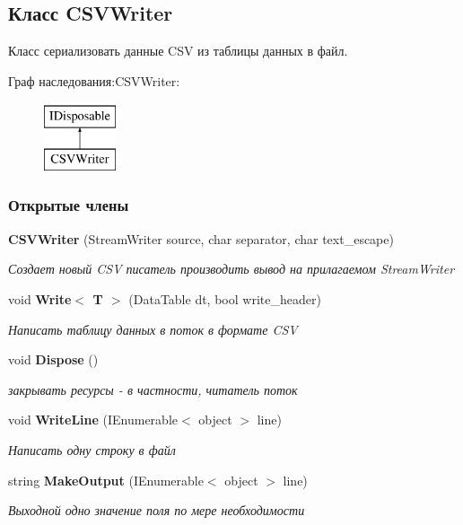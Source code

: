 \subsection{Класс C\+S\+V\+Writer}
\label{classkdz__manager_1_1_c_s_v_writer}


Класс сериализовать данные C\+S\+V из таблицы данных в файл.  


Граф наследования\+:C\+S\+V\+Writer\+:\begin{figure}[H]
\begin{center}
\leavevmode
\includegraphics[height=2.000000cm]{classkdz__manager_1_1_c_s_v_writer}
\end{center}
\end{figure}
\subsubsection*{Открытые члены}
\begin{DoxyCompactItemize}
\item 
{\bf C\+S\+V\+Writer} (Stream\+Writer source, char separator, char text\+\_\+escape)
\begin{DoxyCompactList}\small\item\em Создает новый C\+S\+V писатель производить вывод на прилагаемом Stream\+Writer \end{DoxyCompactList}\item 
void {\bf Write$<$ T $>$} (Data\+Table dt, bool write\+\_\+header)
\begin{DoxyCompactList}\small\item\em Написать таблицу данных в поток в формате C\+S\+V \end{DoxyCompactList}\item 
void {\bf Dispose} ()
\begin{DoxyCompactList}\small\item\em закрывать ресурсы -\/ в частности, читатель поток \end{DoxyCompactList}\item 
void {\bf Write\+Line} (I\+Enumerable$<$ object $>$ line)
\begin{DoxyCompactList}\small\item\em Написать одну строку в файл \end{DoxyCompactList}\item 
string {\bf Make\+Output} (I\+Enumerable$<$ object $>$ line)
\begin{DoxyCompactList}\small\item\em Выходной одно значение поля по мере необходимости \end{DoxyCompactList}\end{DoxyCompactItemize}
